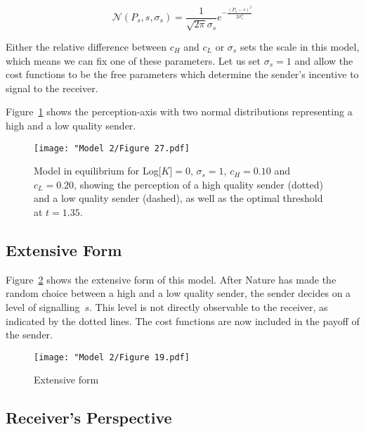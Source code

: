 \documentclass[a4paper,12pt]{article}
\numberwithin{equation}{section}
\begin{document}
\begin{equation}
\label{eq:SignalDetectionModel/Normal}
\mathcal{N}(P_{s}, s, \sigma_{s}) = \frac{1}{\sqrt{2 \pi} \sigma_{s}} e^{-\frac{(P_{s}-s)^2}{2 \sigma_{s}^2}}
\end{equation}

Either the relative difference between $c_{H}$ and $c_{L}$ or $\sigma_{s}$ sets the scale in this model, which means we can fix one of these parameters. Let us set $\sigma_{s}=1$ and allow the cost functions to be the free parameters which determine the sender's incentive to signal to the receiver.

Figure~\ref{fig:Model 2/Figure 27.pdf} shows the perception-axis with two normal distributions representing a high and a low quality sender.

\begin{figure}[!h]
\captionsetup{width=300pt}
\begin{center}
\leavevmode
\texttt{[image: "Model 2/Figure 27.pdf]}
\caption{Model in equilibrium for Log[$K$]$=0$, $\sigma_{s}=1$, $c_{H}=0.10$ and $c_{L}=0.20$, showing the perception of a high quality sender (dotted) and a low quality sender (dashed), as well as the optimal threshold at $t=1.35$.}
\label{fig:Model 2/Figure 27.pdf}
\end{center}
\end{figure}

\subsection{Extensive Form}
\label{sec:SignalDetectionModel/Extensive Form}

Figure~\ref{fig:Model 2/Figure 19.pdf} shows the extensive form of this model. After Nature has made the random choice between a high and a low quality sender, the sender decides on a level of signalling~$s$. This level is not directly observable to the receiver, as indicated by the dotted lines. The cost functions are now included in the payoff of the sender.

\begin{figure}[h]
\begin{center}
\leavevmode
\texttt{[image: "Model 2/Figure 19.pdf]}
\caption{Extensive form}
\label{fig:Model 2/Figure 19.pdf}
\end{center}
\end{figure}


\subsection{Receiver's Perspective}
\label{sec:SignalDetectionModel/Receiver's Perspective}
\end{document}
